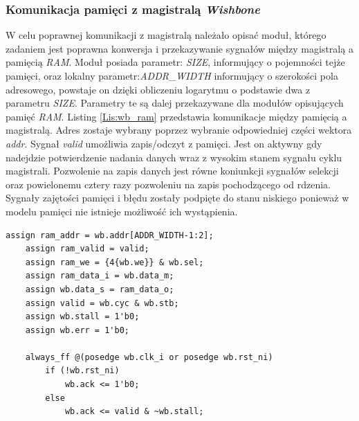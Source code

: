 \documentclass[11pt,a4paper]{article}
\begin{document}
		\subsubsection{Komunikacja pamięci z magistralą \textit{Wishbone}}
			\hspace{5mm}
			W celu poprawnej komunikacji z magistralą należało opisać moduł, którego zadaniem jest poprawna konwersja i przekazywanie sygnałów między magistralą a pamięcią \textit{RAM}. Moduł posiada parametr: \textit{SIZE}, informujący o pojemności tejże pamięci, oraz lokalny parametr:\textit{ADDR\_WIDTH} informujący o szerokości pola adresowego, powstaje on dzięki obliczeniu logarytmu o podstawie dwa z parametru \textit{SIZE}. Parametry te są dalej przekazywane dla modułów opisujących pamięć \textit{RAM}. Listing \ref{Lis:wb_ram} przedstawia komunikacje między pamięcią a magistralą.
			Adres zostaje wybrany poprzez wybranie odpowiedniej części wektora \textit{addr}.  Sygnał \textit{valid} umożliwia zapis/odczyt z pamięci. Jest on aktywny gdy nadejdzie potwierdzenie nadania danych wraz z wysokim stanem sygnału cyklu magistrali. Pozwolenie na zapis danych jest równe koniunkcji sygnałów selekcji oraz powielonemu cztery razy pozwoleniu na zapis pochodzącego od rdzenia. Sygnały zajętości pamięci i błędu zostały podpięte do stanu niskiego ponieważ w modelu pamięci nie istnieje możliwość ich wystąpienia. \\
			\begin{minipage}{\textwidth}
\begin{scriptsize}
\begin{lstlisting}[label=Lis:wb_ram,caption=Komunikacja pamięci z magistralą]
    assign ram_addr = wb.addr[ADDR_WIDTH-1:2];
    assign ram_valid = valid;
    assign ram_we = {4{wb.we}} & wb.sel;
    assign ram_data_i = wb.data_m;
    assign wb.data_s = ram_data_o;
    assign valid = wb.cyc & wb.stb;
    assign wb.stall = 1'b0;
    assign wb.err = 1'b0;
    
    always_ff @(posedge wb.clk_i or posedge wb.rst_ni)
        if (!wb.rst_ni)
            wb.ack <= 1'b0;
        else
            wb.ack <= valid & ~wb.stall;
\end{lstlisting}
\end{scriptsize}
\end{minipage}
\end{document}
